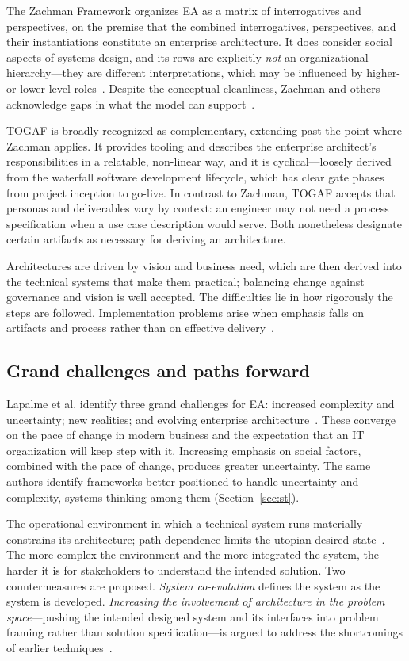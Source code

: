 \documentclass[11pt,a4paper]{article}
\begin{document}
The Zachman Framework organizes EA as a matrix of interrogatives and
perspectives, on the premise that the combined interrogatives, perspectives, and
their instantiations constitute an enterprise architecture. It does consider
social aspects of systems design, and its rows are explicitly \emph{not} an
organizational hierarchy---they are different interpretations, which may be
influenced by higher- or lower-level roles~\citep{zachman_nd}. Despite the
conceptual cleanliness, Zachman and others acknowledge gaps in what the model can
support~\citep{lapalme2016}.

TOGAF is broadly recognized as complementary, extending past the point where
Zachman applies. It provides tooling and describes the enterprise architect's
responsibilities in a relatable, non-linear way, and it is cyclical---loosely
derived from the waterfall software development lifecycle, which has clear gate
phases from project inception to go-live. In contrast to Zachman, TOGAF accepts
that personas and deliverables vary by context: an engineer may not need a
process specification when a use case description would serve. Both nonetheless
designate certain artifacts as necessary for deriving an architecture.

Architectures are driven by vision and business need, which are then derived
into the technical systems that make them practical; balancing change against
governance and vision is well accepted. The difficulties lie in how rigorously
the steps are followed. Implementation problems arise when emphasis falls on
artifacts and process rather than on effective delivery~\citep{bente2012}.

\subsection{Grand challenges and paths forward}

Lapalme et al. identify three grand challenges for EA: increased complexity and
uncertainty; new realities; and evolving enterprise
architecture~\citep{lapalme2016}. These converge on the pace of change in modern
business and the expectation that an IT organization will keep step with it.
Increasing emphasis on social factors, combined with the pace of change,
produces greater uncertainty. The same authors identify frameworks better
positioned to handle uncertainty and complexity, systems thinking among them
(Section~\ref{sec:st}).

The operational environment in which a technical system runs materially
constrains its architecture; path dependence limits the utopian desired
state~\citep{gong2019}. The more complex the environment and the more integrated
the system, the harder it is for stakeholders to understand the intended
solution. Two countermeasures are proposed. \emph{System co-evolution} defines
the system as the system is developed. \emph{Increasing the involvement of
architecture in the problem space}---pushing the intended designed system and
its interfaces into problem framing rather than solution specification---is
argued to address the shortcomings of earlier techniques~\citep{cole2006}.
\end{document}
